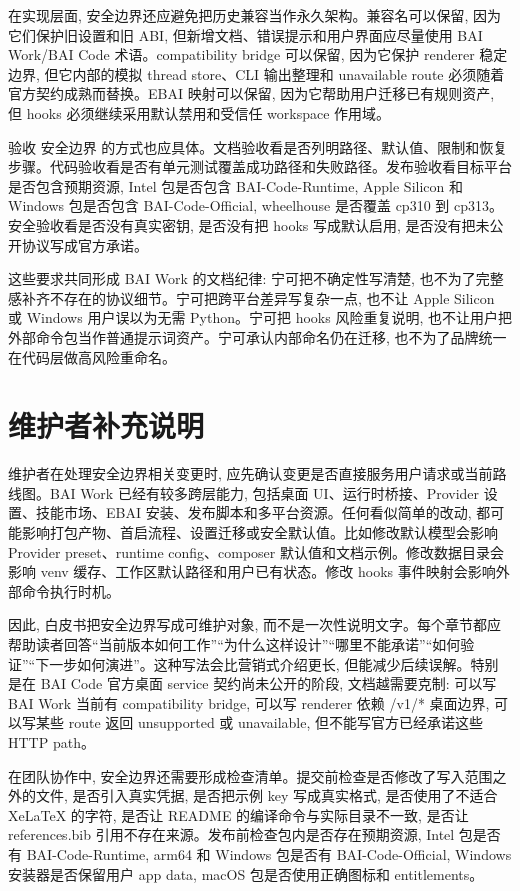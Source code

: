 在实现层面, 安全边界还应避免把历史兼容当作永久架构。兼容名可以保留, 因为它们保护旧设置和旧 ABI, 但新增文档、错误提示和用户界面应尽量使用 BAI Work/BAI Code 术语。compatibility bridge 可以保留, 因为它保护 renderer 稳定边界, 但它内部的模拟 thread store、CLI 输出整理和 unavailable route 必须随着官方契约成熟而替换。EBAI 映射可以保留, 因为它帮助用户迁移已有规则资产, 但 hooks 必须继续采用默认禁用和受信任 workspace 作用域。

验收 安全边界 的方式也应具体。文档验收看是否列明路径、默认值、限制和恢复步骤。代码验收看是否有单元测试覆盖成功路径和失败路径。发布验收看目标平台是否包含预期资源, Intel 包是否包含 BAI-Code-Runtime, Apple Silicon 和 Windows 包是否包含 BAI-Code-Official, wheelhouse 是否覆盖 cp310 到 cp313。安全验收看是否没有真实密钥, 是否没有把 hooks 写成默认启用, 是否没有把未公开协议写成官方承诺。

这些要求共同形成 BAI Work 的文档纪律: 宁可把不确定性写清楚, 也不为了完整感补齐不存在的协议细节。宁可把跨平台差异写复杂一点, 也不让 Apple Silicon 或 Windows 用户误以为无需 Python。宁可把 hooks 风险重复说明, 也不让用户把外部命令包当作普通提示词资产。宁可承认内部命名仍在迁移, 也不为了品牌统一在代码层做高风险重命名。

\section{维护者补充说明}

维护者在处理安全边界相关变更时, 应先确认变更是否直接服务用户请求或当前路线图。BAI Work 已经有较多跨层能力, 包括桌面 UI、运行时桥接、Provider 设置、技能市场、EBAI 安装、发布脚本和多平台资源。任何看似简单的改动, 都可能影响打包产物、首启流程、设置迁移或安全默认值。比如修改默认模型会影响 Provider preset、runtime config、composer 默认值和文档示例。修改数据目录会影响 venv 缓存、工作区默认路径和用户已有状态。修改 hooks 事件映射会影响外部命令执行时机。

因此, 白皮书把安全边界写成可维护对象, 而不是一次性说明文字。每个章节都应帮助读者回答“当前版本如何工作”“为什么这样设计”“哪里不能承诺”“如何验证”“下一步如何演进”。这种写法会比营销式介绍更长, 但能减少后续误解。特别是在 BAI Code 官方桌面 service 契约尚未公开的阶段, 文档越需要克制: 可以写 BAI Work 当前有 compatibility bridge, 可以写 renderer 依赖 /v1/* 桌面边界, 可以写某些 route 返回 unsupported 或 unavailable, 但不能写官方已经承诺这些 HTTP path。

在团队协作中, 安全边界还需要形成检查清单。提交前检查是否修改了写入范围之外的文件, 是否引入真实凭据, 是否把示例 key 写成真实格式, 是否使用了不适合 XeLaTeX 的字符, 是否让 README 的编译命令与实际目录不一致, 是否让 references.bib 引用不存在来源。发布前检查包内是否存在预期资源, Intel 包是否有 BAI-Code-Runtime, arm64 和 Windows 包是否有 BAI-Code-Official, Windows 安装器是否保留用户 app data, macOS 包是否使用正确图标和 entitlements。

